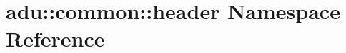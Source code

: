 \hypertarget{namespaceadu_1_1common_1_1header}{\section{adu\-:\-:common\-:\-:header Namespace Reference}
\label{namespaceadu_1_1common_1_1header}
}
